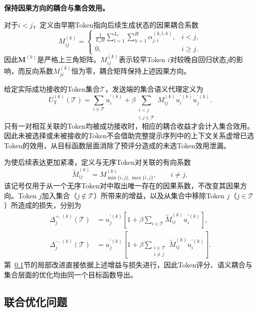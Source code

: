 \documentclass[journal]{IEEEtran}
\begin{document}
\textbf{保持因果方向的耦合与集合效用。}

对于$i<j$，定义由早期Token指向后续生成状态的因果耦合系数
\begin{equation}
M_{ij}^{(k)}=
\begin{cases}
\displaystyle\frac{1}{L_cH}\sum_{l=1}^{L_c}\sum_{h=1}^{H}
\alpha_{j,i}^{(k,l,h)},&i<j,\\[0.55em]
0,&i\geq j.
\end{cases}
\label{eq:coupling_matrix}
\end{equation}
因此$\bm M^{(k)}$是严格上三角矩阵。$M_{ij}^{(k)}$表示较早Token $i$对较晚自回归状态$j$的影响，而反向系数$M_{ji}^{(k)}$恒为零，耦合矩阵保持上述因果方向。

给定实际成功接收的Token集合$\mathcal T$，发送端的集合语义代理定义为
\begin{equation}
U_{\mathrm T}^{(k)}(\mathcal T)
=\sum_{i\in\mathcal T}u_i^{\prime(k)}
+\beta\!\sum_{\substack{i<j\\i,j\in\mathcal T}}
M_{ij}^{(k)}u_i^{\prime(k)}u_j^{\prime(k)}.
\label{eq:set_utility}
\end{equation}
只有一对相互关联的Token均被成功接收时，相应的耦合收益才会计入集合效用。因此未被选择或未被接收的Token不会借助完整提示序列中的上下文关系虚增已选Token的效用，从目标函数层面消除了预评分造成的未选Token效用泄漏。

为使后续表达更加紧凑，定义与无序Token对关联的有向系数
\begin{equation}
\overleftrightarrow M_{ij}^{(k)}
=M_{\min\{i,j\},\max\{i,j\}}^{(k)},
\qquad i\neq j,
\label{eq:incident_coupling}
\end{equation}
该记号仅用于从一个无序Token对中取出唯一存在的因果系数，不改变其因果方向。Token $j$加入集合（$j\notin\mathcal T$）所带来的增益，以及从集合中移除Token $j$（$j\in\mathcal T$）所造成的损失，分别为
\begin{align}
\Delta_j^{+,(k)}(\mathcal T)
&=u_j^{\prime(k)}
\left[1+\beta\sum_{i\in\mathcal T}
 \overleftrightarrow M_{ij}^{(k)}u_i^{\prime(k)}\right],
\label{eq:set_add_gain}\\
\Delta_j^{-,(k)}(\mathcal T)
&=u_j^{\prime(k)}
\left[1+\beta\!\sum_{\substack{i\in\mathcal T\\i\neq j}}
 \overleftrightarrow M_{ij}^{(k)}u_i^{\prime(k)}\right].
\label{eq:set_remove_loss}
\end{align}
第~\ref{sec:optimization}节的局部改进直接依据上述增益与损失进行，因此Token评分、语义耦合与集合层面的优化均由同一个目标函数导出。

\subsection{联合优化问题}
\label{sec:optimization}
\end{document}
